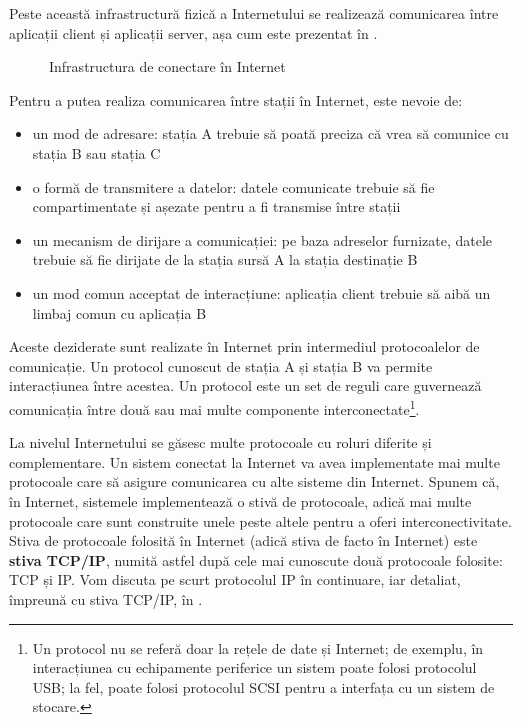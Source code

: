 Peste această infrastructură fizică a Internetului se realizează comunicarea între aplicații client și aplicații server, așa cum este prezentat în .

\begin{figure}[htbp]
  \centering
  \def\svgwidth{\columnwidth}
  
  \caption{Infrastructura de conectare în Internet}
  \label{fig:net:internet-infrastructure}
\end{figure}

Pentru a putea realiza comunicarea între stații în Internet, este nevoie de:

\begin{itemize}
  \item un mod de adresare: stația A trebuie să poată preciza că vrea să comunice cu stația B sau stația C
  \item o formă de transmitere a datelor: datele comunicate trebuie să fie compartimentate și așezate pentru a fi transmise între stații
  \item un mecanism de dirijare a comunicației: pe baza adreselor furnizate, datele trebuie să fie dirijate de la stația sursă A la stația destinație B
  \item un mod comun acceptat de interacțiune: aplicația client trebuie să aibă un limbaj comun cu aplicația B
\end{itemize}

Aceste deziderate sunt realizate în Internet prin intermediul protocoalelor de comunicație.
Un protocol cunoscut de stația A și stația B va permite interacțiunea între acestea.
Un protocol este un set de reguli care guvernează comunicația între două sau mai multe componente interconectate\footnote{Un protocol nu se referă doar la rețele de date și Internet; de exemplu, în interacțiunea cu echipamente periferice un sistem poate folosi protocolul USB; la fel, poate folosi protocolul SCSI pentru a interfața cu un sistem de stocare.}.

La nivelul Internetului se găsesc multe protocoale cu roluri diferite și complementare.
Un sistem conectat la Internet va avea implementate mai multe protocoale care să asigure comunicarea cu alte sisteme din Internet.
Spunem că, în Internet, sistemele implementează o stivă de protocoale, adică mai multe protocoale care sunt construite unele peste altele pentru a oferi interconectivitate.
Stiva de protocoale folosită în Internet (adică stiva de facto în Internet) este \textbf{stiva TCP/IP}, numită astfel după cele mai cunoscute două protocoale folosite: TCP și IP.
Vom discuta pe scurt protocolul IP în continuare, iar detaliat, împreună cu stiva TCP/IP, în .

